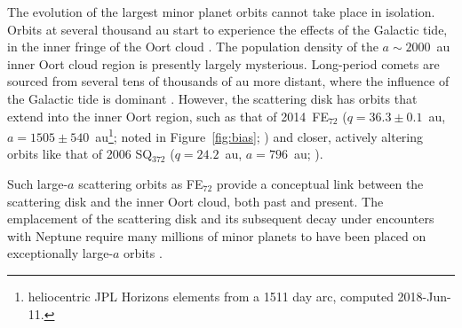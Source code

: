 \documentclass[preprint]{aastex62}
\begin{document}
The evolution of the largest minor planet orbits cannot take place in isolation. 
Orbits at several thousand au start to experience the effects of the Galactic tide, in the inner fringe of the Oort cloud \citep{dones04}.
The population density of the $a \sim 2000$~au inner Oort cloud region is presently largely mysterious. 
Long-period comets are sourced from several tens of thousands of au more distant, where the influence of the Galactic tide is dominant \cite[e.g.][]{dones04}.
However, the scattering disk has orbits that extend into the inner Oort region, such as that of 2014~FE$_{72}$ ($q = 36.3\pm 0.1$~au, $a=1505\pm 540$~au\footnote{heliocentric JPL Horizons elements from a 1511 day arc, computed 2018-Jun-11.}; noted in Figure~\ref{fig:bias}; \citealt{sheppardtrujillo16}) and closer, actively altering orbits like that of 2006 SQ$_{372}$ ($q = 24.2$~au, $a = 796$~au; \citealt{Kaib:2009}).

Such large-$a$ scattering orbits as FE$_{72}$ provide a conceptual link between the scattering disk and the inner Oort cloud, both past and present.
The emplacement of the scattering disk and its subsequent decay under encounters with Neptune require many millions of minor planets to have been placed on exceptionally large-$a$ orbits \citep{gladman05, levison06}.
\end{document}

